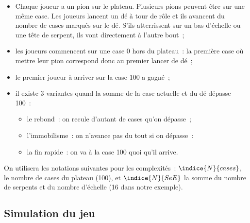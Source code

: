 \begin{itemize}
	\item Chaque joueur a un pion sur le plateau. Plusieurs pions peuvent être sur une même case. Les joueurs lancent un dé à tour de rôle et ils avancent du nombre de cases marqués sur le dé. S'ils atterrissent sur un bas d'échelle ou une tête de serpent, ils vont directement à l'autre bout~;
	\item les joueurs commencent sur une case 0 hors du plateau~: la première case où mettre leur pion correspond donc au premier lancer de dé~;
	\item le premier joueur à arriver sur la case 100 a gagné~; 
	\item il existe 3 variantes quand la somme de la case actuelle et du dé dépasse 100~:
	\begin{itemize}
		\item le rebond~: on recule d'autant de cases qu'on dépasse~;
		\item l'immobilisme~: on n'avance pas du tout si on dépasse~: 
		\item la fin rapide~: on va à la case 100 quoi qu'il arrive. 
	\end{itemize}
\end{itemize}

On utilisera les notations suivantes pour les complexités~: $\indice{N}{cases}$, le nombre de cases du plateau (100), et $\indice{N}{SeE}$ la somme du nombre de serpents et du nombre d'échelle (16 dans notre exemple).

\subsection*{Simulation du jeu}
 
%	

   
   	


